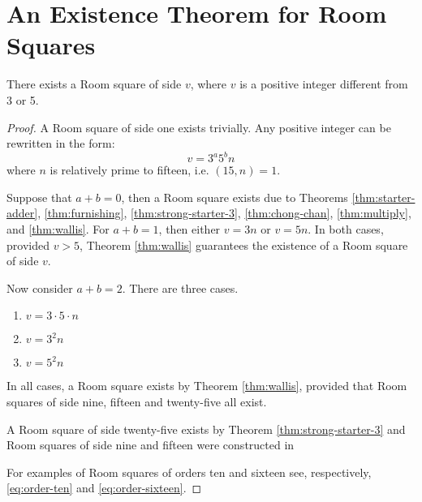 \chapter{An Existence Theorem for Room Squares}
\label{ch:existence-theorem}

\begin{theorem}
There exists a Room square of side $v$, where $v$ is a positive integer different from 3 or 5.
\end{theorem}

\begin{proof}
A Room square of side one exists trivially.
Any positive integer can be rewritten in the form:
\begin{equation}
v = 3^{a}5^{b}n
\end{equation}
where $n$ is relatively prime to fifteen, i.e. $(15, n) = 1$.

Suppose that $a + b = 0$, then a Room square exists due to Theorems
\ref{thm:starter-adder},
\ref{thm:furnishing},
\ref{thm:strong-starter-3},
\ref{thm:chong-chan},
\ref{thm:multiply},
and
\ref{thm:wallis}.
For $a + b = 1$, then either $v = 3n$ or $v = 5n$.
In both cases, provided $v > 5$, Theorem \ref{thm:wallis} guarantees the existence of a Room square of side $v$.

Now consider $a + b = 2$.
There are three cases.

\begin{enumerate}
  \item{$v = 3\cdot 5\cdot n$}
  \item{$v = 3^{2}n$}
  \item{$v = 5^{2}n$}
\end{enumerate}

In all cases, a Room square exists by Theorem \ref{thm:wallis}, provided that Room squares of side nine, fifteen and twenty-five all exist.

A Room square of side twenty-five exists by Theorem \ref{thm:strong-starter-3} and Room squares of side nine and fifteen were constructed in
\cite{mullinFurnishingRoomSquares1969}

For examples of Room squares of orders ten and sixteen see, respectively, \eqref{eq:order-ten} and \eqref{eq:order-sixteen}.


\end{proof}
